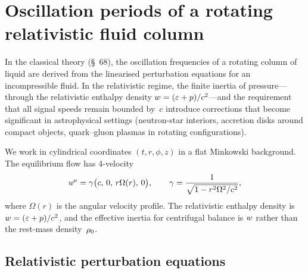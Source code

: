 %
%
\section{Oscillation periods of a rotating relativistic fluid column}
\label{sec:rel-7-68}

In the classical theory (\S~68), the oscillation frequencies of a
rotating column of liquid are derived from the linearised perturbation
equations for an incompressible fluid.  In the relativistic regime,
the finite inertia of pressure---through the relativistic enthalpy
density $w = (\varepsilon + p)/c^{2}$---and the requirement that all
signal speeds remain bounded by~$c$ introduce corrections that become
significant in astrophysical settings (neutron-star interiors, accretion
disks around compact objects, quark--gluon plasmas in rotating
configurations).

We work in cylindrical coordinates $(t,r,\phi,z)$ in a flat Minkowski
background.  The equilibrium flow has 4-velocity
\begin{equation}
\label{eq:rel-7-68-ubase}
u^\mu = \gamma\bigl(c,\,0,\,r\Omega(r),\,0\bigr),\qquad
\gamma = \frac{1}{\sqrt{1 - r^2\Omega^2/c^2}},
\end{equation}
where $\Omega(r)$ is the angular velocity profile.  The relativistic
enthalpy density is $w = (\varepsilon + p)/c^{2}$, and the effective
inertia for centrifugal balance is $w$ rather than the
rest-mass density~$\rho_0$.

\subsection{Relativistic perturbation equations}
\label{sec:rel-7-68-perturb}


